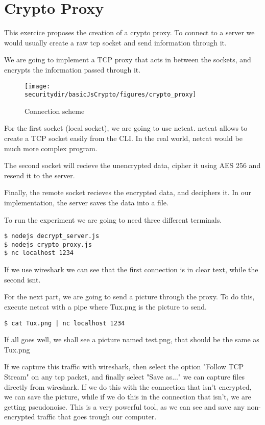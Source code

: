 \section{Crypto Proxy}
This exercice proposes the creation of a crypto proxy. To connect to a server we would usually create a raw tcp socket and send information through it. 

We are going to implement a TCP proxy that acts in between the sockets, and encrypts the information passed through it.

\begin{figure}[htb]
	\begin{centering}
		\texttt{[image: \\securitydir/basicJsCrypto/figures/crypto\_proxy]}
		\par\end{centering}
	\caption{\label{fig:crypto_proxy} Connection scheme}
\end{figure}


For the first socket (local socket), we are going to use netcat. netcat allows to create a TCP socket easily from the CLI. In the real world, netcat would be much more complex program.

The second socket will recieve the unencrypted data, cipher it using AES 256 and resend it to the server.

Finally, the remote socket recieves the encrypted data, and deciphers it. In our implementation, the server saves the data into a file.

To run the experiment we are going to need three different terminals.

\begin{lstlisting}[style=terms]
$ nodejs decrypt_server.js
$ nodejs crypto_proxy.js
$ nc localhost 1234
\end{lstlisting}


If we use wireshark we can see that the first connection is in clear text, while the second isnt.

For the next part, we are going to send a picture through the proxy. To do this, execute netcat with a pipe where Tux.png is the picture to send.

\begin{lstlisting}[style=terms]
$ cat Tux.png | nc localhost 1234
\end{lstlisting}

If all goes well, we shall see a picture named test.png, that should be the same as Tux.png

If we capture this traffic with wireshark, then select the option "Follow TCP Stream" on any tcp packet, and finally select "Save as..." we can capture files directly from wireshark. If we do this with the connection that isn't encrypted, we can save the picture, while if we do this in the connection that isn't, we are getting pseudonoise. This is a very powerful tool, as we can see and save any non-encrypted traffic that goes trough our computer.

